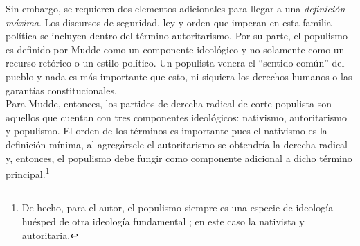 Sin embargo, se requieren dos elementos adicionales para llegar a una \textit{definición máxima}. Los discursos de seguridad, ley y orden que imperan en esta familia política se incluyen dentro del término autoritarismo. Por su parte, el populismo es definido por Mudde como un componente ideológico y no solamente como un recurso retórico o un estilo político. Un populista venera el ``sentido común'' del pueblo y nada es más importante que esto, ni siquiera los derechos humanos o las garantías constitucionales.\\

Para Mudde, entonces, los partidos de derecha radical de corte populista son aquellos que cuentan con tres componentes ideológicos: nativismo, autoritarismo y populismo. El orden de los términos es importante pues el nativismo es la definición mínima, al agregársele el autoritarismo se obtendría la derecha radical y, entonces, el populismo debe fungir como componente adicional a dicho término principal.\footnote{De hecho, para el autor, el populismo siempre es una especie de ideología huésped de otra ideología fundamental \parencite{MuddeRovira17}; en este caso la nativista y autoritaria.}\\ 

